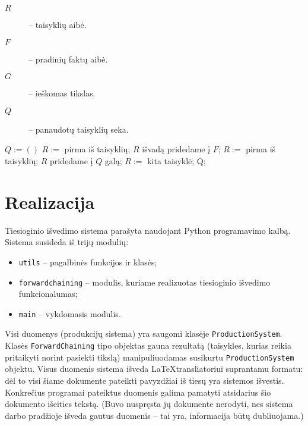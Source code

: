 \begin{description}
  \item[$R$] – taisyklių aibė.
  \item[$F$] – pradinių faktų aibė.
  \item[$G$] – ieškomas tikslas.
  \item[$Q$] – panaudotų taisyklių seka.
\end{description}
\begin{algorithmic}[1]
    \State $Q := \left(  \right)$
    \State $R :=$ pirma iš taisyklių;
                                        \label{fc:pseudo:while_condition}
                                        \label{fc:pseudo:if_condition}
        \State $R$ išvadą pridedame į $F$;
                                        \label{fc:pseudo:add_fact}
        \State $R := $ pirma iš taisyklių;
                                        \label{fc:pseudo:start}
        \State $R$ pridedame į $Q$ galą;
                                        \label{fc:pseudo:add_rule}
      \Else
        \State $R := $ kita taisyklė;   \label{fc:pseudo:next_rule}
      \EndIf
    \EndWhile
    \State \Return Q;
  \EndFunction
\end{algorithmic}

\section{Realizacija}

Tiesioginio išvedimo sistema parašyta naudojant Python programavimo
kalbą. Sistema susideda iš trijų modulių:
\begin{itemize}
  \item \verb|utils| – pagalbinės funkcijos ir klasės;
  \item \verb|forwardchaining| – modulis, kuriame realizuotas
    tiesioginio išvedimo funkcionalumas;
  \item \verb|main| – vykdomasis modulis.
\end{itemize}

\begin{sloppypar}
Visi duomenys (produkcijų sistema) yra saugomi klasėje
\verb|ProductionSystem|. Klasės \verb|ForwardChaining| tipo objektas
gauna rezultatą (taisykles, kurias reikia pritaikyti norint pasiekti
tikslą) manipuliuodamas susikurtu \verb|ProductionSystem| objektu.
Visus duomenis sistema išveda \LaTeX transliatoriui suprantamu formatu:
dėl to visi šiame dokumente pateikti pavyzdžiai iš tiesų yra
sistemos išvestis. Konkrečius programai pateiktus duomenis
galima pamatyti atsidarius šio dokumento išeities tekstą. (Buvo
nuspręsta jų dokumente nerodyti, nes sistema darbo pradžioje išveda
gautus duomenis – tai yra, informacija būtų dubliuojama.)
\end{sloppypar}

